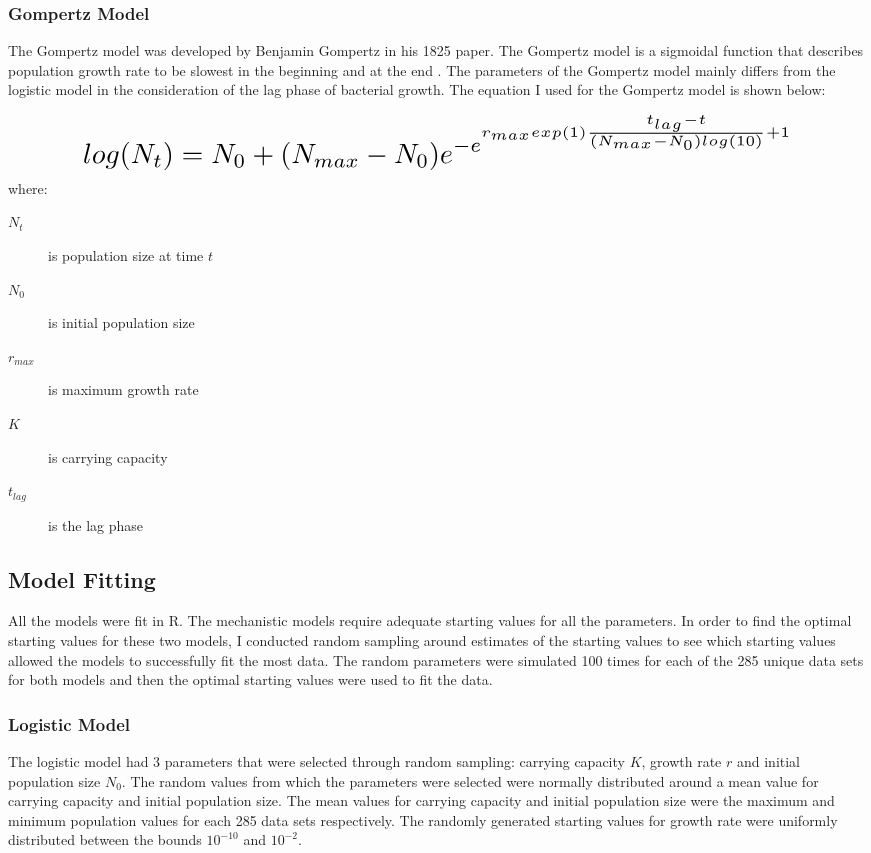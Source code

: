 \documentclass[11pt]{article}
\begin{document}
    \subsubsection{Gompertz Model}
    The Gompertz model was developed by Benjamin Gompertz in his 1825 paper. The Gompertz model is a sigmoidal function that describes population growth rate to be slowest in the beginning and at the end \citep{gompertz1825xxiv}. The parameters of the Gompertz model mainly differs from the logistic model in the consideration of the lag phase of bacterial growth. The equation I used for the Gompertz model is shown below:
   
    \[ \scalebox{2}{$\displaystyle log(N_t)= N_0 + (N_{max} - N_0)e^{-e^{r_{max}exp(1)\frac {t_{lag}-t}{(N_{max}-N_0)log(10)}+1}}$} \]
    where:
    \begin{description}
    \item[$N_{t}$] is population size at time $t$
    \item[$N_{0}$] is initial population size
    \item[$r_{max}$] is maximum growth rate
    \item[$K$] is carrying capacity
    \item[$t_{lag}$] is the lag phase
    \end{description}
    
    \subsection{Model Fitting}
    All the models were fit in R. The mechanistic models require adequate starting values for  all the parameters. In order to find the optimal starting values for these two models, I conducted random sampling around estimates of the starting values to see which starting values allowed the models to successfully fit the most data. The random parameters were simulated 100 times for each of the 285 unique data sets for both models and then the optimal starting values were used to fit the data.
    
    \subsubsection{Logistic Model}
    The logistic model had 3 parameters that were selected through random sampling: carrying capacity $K$, growth rate $r$ and initial population size $N_0$. The random values from which the parameters were selected were normally distributed around a mean value for carrying capacity and initial population size. The mean values for carrying capacity and initial population size were the maximum and minimum population values for each 285 data sets respectively. The randomly generated starting values for growth rate were uniformly distributed between the bounds $10^{-10}$ and $10^{-2}$.
    
\end{document}
